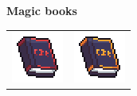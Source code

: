 \documentclass[../Main.tex]{subfiles}
\begin{document}
            \textbf{Magic books}
            \begin{center}
                \begin{tabular}{ m{} m{} }
                    \centerline{\includegraphics{../res/textures/items/potions/books/MagicRed.png}} & \centerline{\includegraphics{../res/textures/items/potions/books/MagicYellow.png}}\\
                \end{tabular}
            \end{center}
\end{document}
